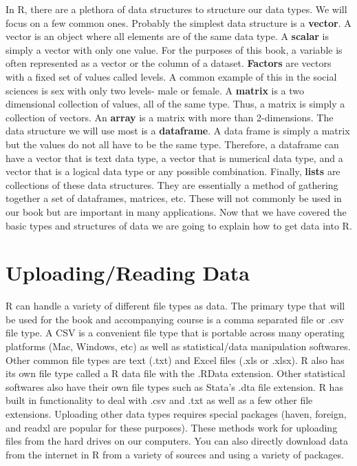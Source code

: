 \documentclass[11pt,openany]{book}\usepackage[]{graphicx}\usepackage[]{color}
\begin{document}
{In R, there are  a plethora of data structures to structure our data types. We will focus on a few common ones. Probably the simplest data structure is a \textbf{vector}. A vector is an object where all elements are of the same data type. A \textbf{scalar} is simply a vector with only one value. For the purposes of this book, a variable is often represented as a vector or the column of a dataset. \textbf{Factors} are vectors with a fixed set of values called levels. A common example of this in the social sciences is sex with only two levels- male or female. A \textbf{matrix} is a two dimensional collection of values, all of the same type. Thus, a matrix is simply a collection of vectors. An \textbf{array} is a matrix with more than 2-dimensions. The data structure we will use most is a \textbf{dataframe}. A data frame is simply a matrix but the values do not all have to be the same type. Therefore, a dataframe can have a vector that is text data type, a vector that is numerical data type, and a vector that is a logical data type or any possible combination. Finally, \textbf{lists} are collections of these data structures. They are essentially a method of gathering together a set of dataframes, matrices, etc. These will not commonly be used in our book but are important in many applications. Now that we have covered the basic types and structures of data we are going to explain how to get data into R. 

\section{Uploading/Reading Data}

R can handle a variety of different file types as data. The primary type that will be used for the book and accompanying course is a comma separated file or .csv file type. A CSV is a convenient file type that is portable across many operating platforms (Mac, Windows, etc) as well as statistical/data manipulation softwares. Other common file types are text (.txt) and Excel files (.xls or .xlsx). R also has its own file type called a R data file with the .RData extension. Other statistical softwares also have their own file types such as Stata's .dta file extension. R has built in functionality to deal with .csv and .txt as well as a few other file extensions. Uploading other data types requires special packages (haven, foreign, and readxl are popular for these purposes). These methods work for uploading files from the hard drives on our computers. You can also directly download data from the internet in R from a variety of sources and using a variety of packages. 

}
\end{document}
